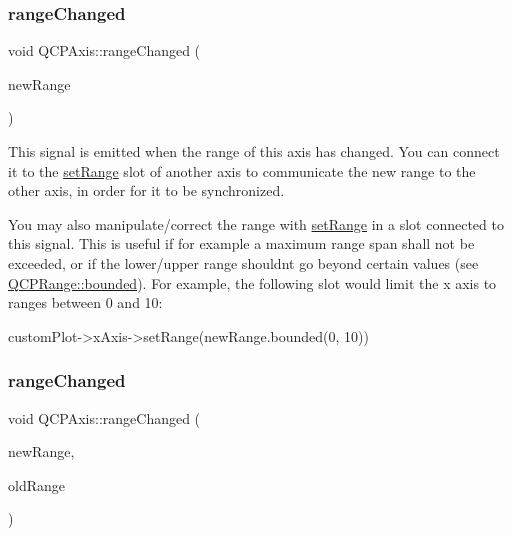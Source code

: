\subsubsection{\texorpdfstring{range\+Changed}{rangeChanged}\hspace{0.1cm}{\footnotesize\ttfamily [1/2]}}
{\footnotesize\ttfamily void Q\+C\+P\+Axis\+::range\+Changed (\begin{DoxyParamCaption}\item[{const \hyperlink{class_q_c_p_range}{Q\+C\+P\+Range} \&}]{new\+Range }\end{DoxyParamCaption})\hspace{0.3cm}{\ttfamily [signal]}}

This signal is emitted when the range of this axis has changed. You can connect it to the \hyperlink{class_q_c_p_axis_aebdfea5d44c3a0ad2b4700cd4d25b641}{set\+Range} slot of another axis to communicate the new range to the other axis, in order for it to be synchronized.

You may also manipulate/correct the range with \hyperlink{class_q_c_p_axis_aebdfea5d44c3a0ad2b4700cd4d25b641}{set\+Range} in a slot connected to this signal. This is useful if for example a maximum range span shall not be exceeded, or if the lower/upper range shouldn\textquotesingle{}t go beyond certain values (see \hyperlink{class_q_c_p_range_a22151e18d961d762d25721211e89c2e5}{Q\+C\+P\+Range\+::bounded}). For example, the following slot would limit the x axis to ranges between 0 and 10\+: 
\begin{DoxyCode}
customPlot->xAxis->setRange(newRange.bounded(0, 10))
\end{DoxyCode}
 \mbox{\label{class_q_c_p_axis_aac8576288e8e31f16186124bc10dd10d}} 
\subsubsection{\texorpdfstring{range\+Changed}{rangeChanged}\hspace{0.1cm}{\footnotesize\ttfamily [2/2]}}
{\footnotesize\ttfamily void Q\+C\+P\+Axis\+::range\+Changed (\begin{DoxyParamCaption}\item[{const \hyperlink{class_q_c_p_range}{Q\+C\+P\+Range} \&}]{new\+Range,  }\item[{const \hyperlink{class_q_c_p_range}{Q\+C\+P\+Range} \&}]{old\+Range }\end{DoxyParamCaption})\hspace{0.3cm}{\ttfamily [signal]}}

